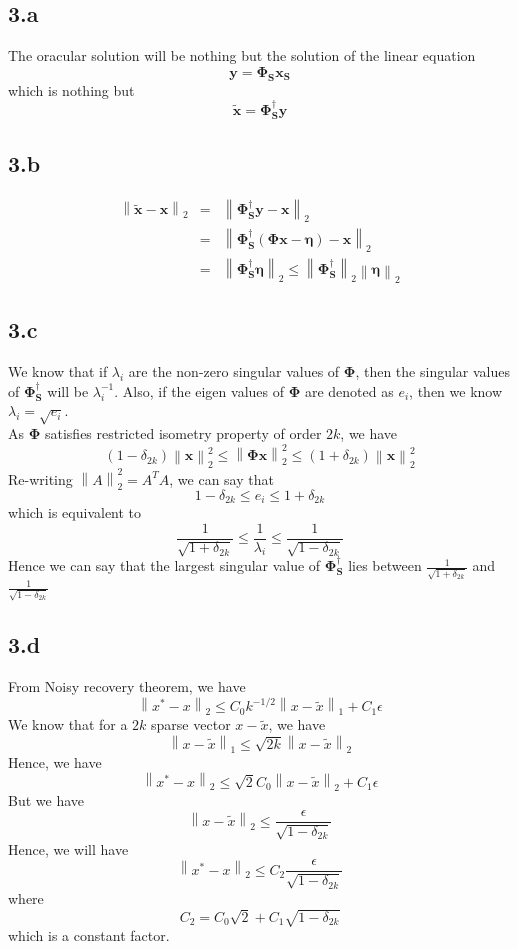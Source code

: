 \documentclass[12pt]{article}
\newcommand{\norm}[1]{\left\lVert #1 \right\rVert}
\begin{document}
\subsection*{3.a}
The oracular solution will be nothing but the solution of the linear equation
$$\boldsymbol{y} = \boldsymbol{\Phi_S} \boldsymbol{x_S}$$
which is nothing but
$$\boldsymbol{\tilde{x}} = \boldsymbol{\Phi_S^\dagger}\boldsymbol{y}$$
\subsection*{3.b}
\begin{eqnarray*}
\norm{\boldsymbol{\tilde{x}} - \boldsymbol{x}}_2 &=& \norm{\boldsymbol{\Phi_S^\dagger y - x}}_2\\
&=&\norm{\boldsymbol{\Phi_S^\dagger}(\boldsymbol{\Phi x - \eta}) - \boldsymbol{x}}_2\\
&=& \norm{\boldsymbol{\Phi_S^\dagger \eta}}_2 \leq \norm{\boldsymbol{\Phi_S^\dagger}}_2 \norm{\boldsymbol{\eta}}_2
\end{eqnarray*}
\subsection*{3.c}
We know that if $\lambda_i$ are the non-zero singular values of $\boldsymbol{\Phi}$, then the singular values of $\boldsymbol{\Phi_S^\dagger}$ will be $\lambda_i^{-1}$. Also, if the eigen values of $\boldsymbol{\Phi}$ are denoted as $e_i$, then we know $\lambda_i = \sqrt{e_i}$.\\
As $\boldsymbol{\Phi}$ satisfies restricted isometry property of order $2k$, we have
$$(1 - \delta_{2k}) \norm{\boldsymbol{x}}_2^2 \leq \norm{\boldsymbol{\Phi x}}_2^2 \leq (1 + \delta_{2k}) \norm{\boldsymbol{x}}_2^2$$
Re-writing $\norm{A}_2^2 = A^T A$, we can say that 
$$1 - \delta_{2k} \leq e_i \leq 1 + \delta_{2k}$$
which is equivalent to
$$\frac{1}{\sqrt{1 + \delta_{2k}}} \leq \frac{1}{\lambda_i} \leq \frac{1}{\sqrt{1 - \delta_{2k}}}$$
Hence we can say that the largest singular value of $\boldsymbol{\Phi_S^\dagger}$ lies between $\frac{1}{\sqrt{1 + \delta_{2k}}}$ and $\frac{1}{\sqrt{1 - \delta_{2k}}}$
\subsection*{3.d}
From Noisy recovery theorem, we have
$$\norm{x^* - x}_2 \leq C_0 k^{-1/2} \norm{x - \tilde{x}}_1 + C_1 \epsilon$$
We know that for a $2k$ sparse vector $x - \tilde{x}$, we have
$$\norm{x - \tilde{x}}_1 \leq \sqrt{2k} \norm{x - \tilde{x}}_2$$
Hence, we have
$$\norm{x^* - x}_2 \leq \sqrt{2} C_0 \norm{x - \tilde{x}}_2 + C_1 \epsilon$$
But we have
$$\norm{x - \tilde{x}}_2 \leq \frac{\epsilon}{\sqrt{1 - \delta_{2k}}}$$
Hence, we will have
$$\norm{x^* - x}_2 \leq C_2 \frac{\epsilon}{\sqrt{1 - \delta_{2k}}}$$
where 
$$C_2 = C_0 \sqrt{2}+ C_1 \sqrt{1 - \delta_{2k}}$$
which is a constant factor.
\end{document}
